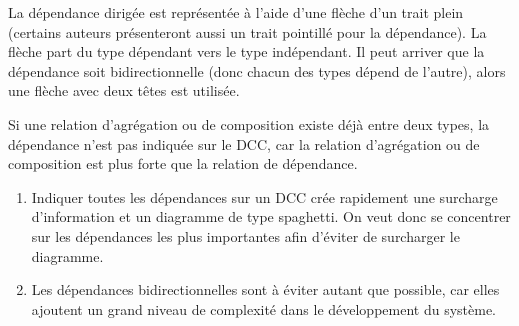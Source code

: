 La dépendance dirigée est représentée à l'aide d'une flèche d'un trait plein (certains auteurs présenteront aussi un trait pointillé pour la dépendance). La flèche part du type dépendant vers le type indépendant. Il peut arriver que la dépendance soit bidirectionnelle (donc chacun des types dépend de l'autre), alors une flèche avec deux têtes est utilisée.

Si une relation d'agrégation ou de composition existe déjà entre deux types, la dépendance n'est pas indiquée sur le \acrshort{DCC}, car la relation d'agrégation ou de composition est plus forte que la relation de dépendance.

\begin{bonnepratique}
	\begin{enumerate}
		\item Indiquer toutes les dépendances sur un \acrshort{DCC} crée rapidement une surcharge d'information et un diagramme de type spaghetti. On veut donc se concentrer sur les dépendances les plus importantes afin d'éviter de surcharger le diagramme.
		\item Les dépendances bidirectionnelles sont à éviter autant que possible, car elles ajoutent un grand niveau de complexité dans le développement du système.
	\end{enumerate}
\end{bonnepratique}

